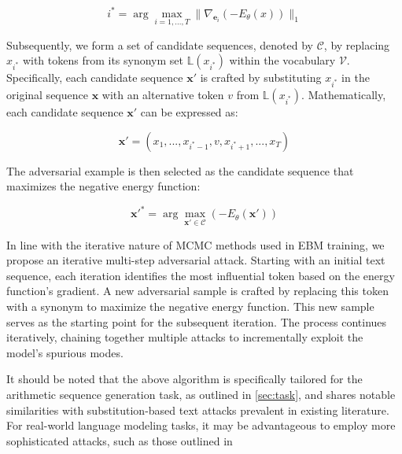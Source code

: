 \documentclass{article}
\begin{document}
\begin{equation}
  i^* = \arg\max_{i=1,...,T}\|\nabla_{\mathbf{e}_i} (-E_\theta(x))\|_1
\end{equation}

Subsequently, we form a set of candidate sequences, denoted by \( \mathcal{C} \), by replacing \( x_{i^*} \) with tokens from its synonym set \( \mathbb{L}(x_{i^*}) \) within the vocabulary \( \mathcal{V} \). Specifically, each candidate sequence \( \mathbf{x'} \) is crafted by substituting \( x_{i^*} \) in the original sequence \( \mathbf{x} \) with an alternative token \( v \) from \( \mathbb{L}(x_{i^*}) \). Mathematically, each candidate sequence \( \mathbf{x'} \) can be expressed as:

\begin{equation}
  \mathbf{x'} = (x_1, ..., x_{i^*-1}, v, x_{i^*+1}, ..., x_T)
\end{equation}

The adversarial example is then selected as the candidate sequence that maximizes the negative energy function:

\begin{equation}
  \mathbf{x'}^* = \arg\max_{\mathbf{x'} \in \mathcal{C}} (-E_\theta(\mathbf{x'}))
\end{equation}

In line with the iterative nature of MCMC methods used in EBM training, we propose an iterative multi-step adversarial attack. Starting with an initial text sequence, each iteration identifies the most influential token based on the energy function's gradient. A new adversarial sample is crafted by replacing this token with a synonym to maximize the negative energy function. This new sample serves as the starting point for the subsequent iteration. The process continues iteratively, chaining together multiple attacks to incrementally exploit the model's spurious modes.


It should be noted that the above algorithm  is specifically tailored for the arithmetic sequence generation task, as outlined in \cref{sec:task}, and shares notable similarities with substitution-based text attacks prevalent in existing literature.
For real-world language modeling tasks, it may be advantageous to employ more sophisticated attacks, such as those outlined in \cite{morris2020textattack}
\end{document}

